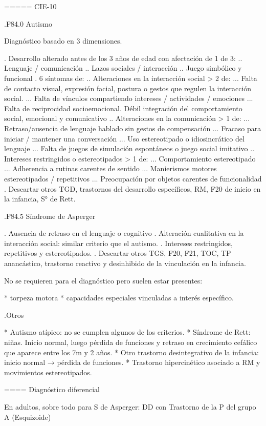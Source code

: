 ===== CIE-10

.F84.0 Autismo

Diagnóstico basado en 3 dimensiones.

. Desarrollo alterado antes de los 3 años de edad con afectación de 1 de 3:
.. Lenguaje / comunicación
.. Lazos sociales / interacción
.. Juego simbólico y funcional
. 6 síntomas de:
.. Alteraciones en la interacción social > 2 de:
... Falta de contacto visual, expresión facial, postura o gestos que regulen la interacción social.
... Falta de vínculos compartiendo intereses / actividades / emociones
... Falta de reciprocidad socioemocional. Débil integración del comportamiento social, emocional y comunicativo
.. Alteraciones en la comunicación > 1 de:
... Retraso/ausencia de lenguaje hablado sin gestos de compensación
... Fracaso para iniciar / mantener una conversación
... Uso estereotipado o idiosincrático del lenguaje
... Falta de juegos de simulación espontáneos o juego social imitativo
.. Intereses restringidos o estereotipados > 1 de:
... Comportamiento estereotipado
... Adherencia a rutinas carentes de sentido
... Manierismos motores estereotipados / repetitivos
... Preocupación por objetos carentes de funcionalidad
. Descartar otros TGD, trastornos del desarrollo específicos, RM, F20 de inicio en la infancia, S° de Rett.

.F84.5 Síndrome de Asperger

. Ausencia de retraso en el lenguaje o cognitivo
. Alteración cualitativa en la interacción social: similar criterio que el autismo.
. Intereses restringidos, repetitivos y estereotipados.
. Descartar otros TGS, F20, F21, TOC, TP anancástico, trastorno reactivo y desinhibido de la vinculación en la infancia.

No se requieren para el diagnóstico pero suelen estar presentes:

* torpeza motora
* capacidades especiales vinculadas a interés específico.

.Otros

* Autismo atípico: no se cumplen algunos de los criterios.
* Síndrome de Rett: niñas. Inicio normal, luego pérdida de funciones y retraso en crecimiento cefálico que aparece entre los 7m y 2 años.
* Otro trastorno desintegrativo de la infancia: inicio normal → pérdida de funciones.
* Trastorno hipercinético asociado a RM y movimientos estereotipados.


==== Diagnóstico diferencial

En adultos, sobre todo para S de Asperger: DD con Trastorno de la P del grupo A (Esquizoide)

